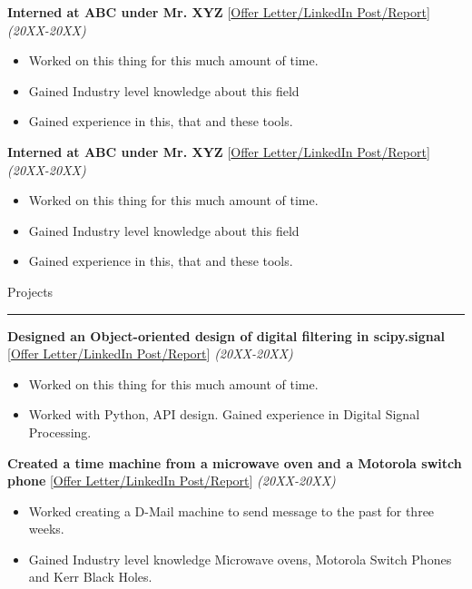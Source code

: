 \documentclass[10pt, hidelinks]{article}
\begin{document}
	{\vspace*{-3mm}\normalsize\textbf{Interned at ABC under Mr. XYZ}} {\small[\href{https://httpbin.com}{Offer Letter/LinkedIn Post/Report}]} \hspace*{8pt} {\normalsize\textit{(20XX-20XX)}}
	{\vspace*{-3mm}
	\begin{itemize}
		\itemsep-0.3em
		\item Worked on this thing for this much amount of time.
		\item Gained Industry level knowledge about this field
		\item Gained experience in this, that and these tools.
	\end{itemize}
	}
	{\vspace*{-3mm}\normalsize\textbf{Interned at ABC under Mr. XYZ}} {\small[\href{https://httpbin.com}{Offer Letter/LinkedIn Post/Report}]} \hspace*{8pt} {\normalsize\textit{(20XX-20XX)}}
	{\vspace*{-3mm}
	\begin{itemize}
		\itemsep-0.3em
		\item Worked on this thing for this much amount of time.
		\item Gained Industry level knowledge about this field
		\item Gained experience in this, that and these tools.
	\end{itemize}
	}


	{\large\color{RoyalBlue}Projects}
	\par\noindent\rule[7pt]{\textwidth}{0.1pt}

	{\vspace*{-3mm}\normalsize\textbf{Designed an Object-oriented design of digital filtering in scipy.signal}} {\small[\href{https://httpbin.com}{Offer Letter/LinkedIn Post/Report}]} \hspace*{8pt} {\normalsize\textit{(20XX-20XX)}}
	{\vspace*{-3mm}
	\begin{itemize}
		\itemsep-0.3em
		\item Worked on this thing for this much amount of time.
		\item Worked with Python, API design. Gained experience in Digital Signal Processing.
	\end{itemize}
	}
	{\vspace*{-3mm}\normalsize\textbf{Created a time machine from a microwave oven and a Motorola switch phone}} {\small[\href{https://httpbin.com}{Offer Letter/LinkedIn Post/Report}]} \hspace*{8pt} {\normalsize\textit{(20XX-20XX)}}
	{\vspace*{-3mm}
	\begin{itemize}
		\itemsep-0.3em
		\item Worked creating a D-Mail machine to send message to the past for three weeks.
		\item Gained Industry level knowledge Microwave ovens, Motorola Switch Phones and Kerr Black Holes.
	\end{itemize}
	}
\end{document}
